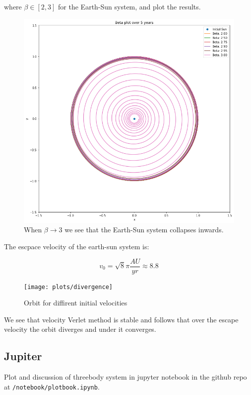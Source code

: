 \documentclass[a4paper, fontsize=11pt]{article}
\begin{document}
where $\beta \in [2,3]$ for the Earth-Sun system, and plot the results.

\begin{figure}[H]
\includegraphics[scale=0.45]{plots/beta}
\caption{When $\beta \rightarrow 3$ we see that the Earth-Sun system collapses inwards.}
\label{fig:Beta}
\end{figure}

The escpace velocity of the earth-sun system is:

\begin{equation}
v_0 = \sqrt{8} \pi \frac{AU}{yr} \approx 8.8
\end{equation}

\begin{figure}[H]
\texttt{[image: plots/divergence]}
\caption{Orbit for diffirent initial velocities}
\label{fig:Euler}
\end{figure}

We see that velocity Verlet method is stable and follows that over the escape velocity the orbit diverges and under it converges.

\subsection{Jupiter}
Plot and discussion of threebody system in jupyter notebook in the github repo at \verb+/notebook/plotbook.ipynb+.
\end{document}
